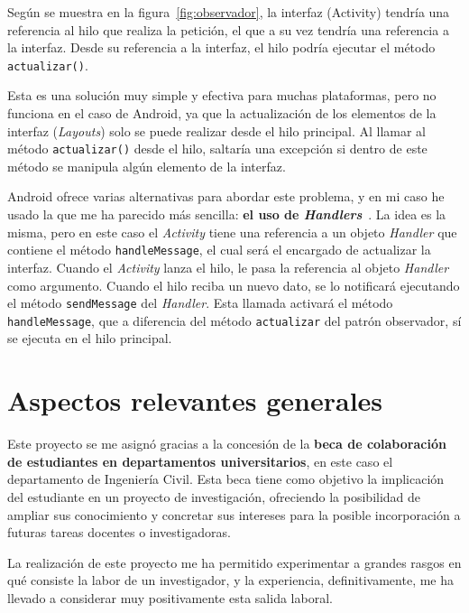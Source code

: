 Según se muestra en la figura~\ref{fig:observador}, la interfaz (Activity) tendría una referencia al hilo que realiza la petición, el que a su vez tendría una referencia a la interfaz. Desde su referencia a la interfaz, el hilo podría ejecutar el método \texttt{actualizar()}.

Esta es una solución muy simple y efectiva para muchas plataformas, pero no funciona en el caso de Android, ya que la actualización de los elementos de la interfaz (\textit{Layouts}) solo se puede realizar desde el hilo principal. Al llamar al método \texttt{actualizar()} desde el hilo, saltaría una excepción si dentro de este método se manipula algún elemento de la interfaz. 

Android ofrece varias alternativas para abordar este problema, y en mi caso he usado la que me ha parecido más sencilla: \textbf{el uso de \textit{Handlers}}~\cite{handler}. La idea es la misma, pero en este caso el \textit{Activity} tiene una referencia a un objeto \textit{Handler} que contiene el método \texttt{handleMessage}, el cual será el encargado de actualizar la interfaz. Cuando el \textit{Activity} lanza el hilo, le pasa la referencia al objeto \textit{Handler} como argumento. Cuando el hilo reciba un nuevo dato, se lo notificará ejecutando el método \texttt{sendMessage} del \textit{Handler}. Esta llamada activará el método \texttt{handleMessage}, que a diferencia del método \texttt{actualizar} del patrón observador, sí se ejecuta en el hilo principal. 

\section{Aspectos relevantes generales}

Este proyecto se me asignó gracias a la concesión de la \textbf{beca de colaboración de estudiantes en departamentos universitarios}, en este caso el departamento de Ingeniería Civil. Esta beca tiene como objetivo la implicación del estudiante en un proyecto de investigación, ofreciendo la posibilidad de ampliar sus conocimiento y concretar sus intereses para la posible incorporación a futuras tareas docentes o investigadoras. 

La realización de este proyecto me ha permitido experimentar a grandes rasgos en qué consiste la labor de un investigador, y la experiencia, definitivamente, me ha llevado a considerar muy positivamente esta salida laboral. 


